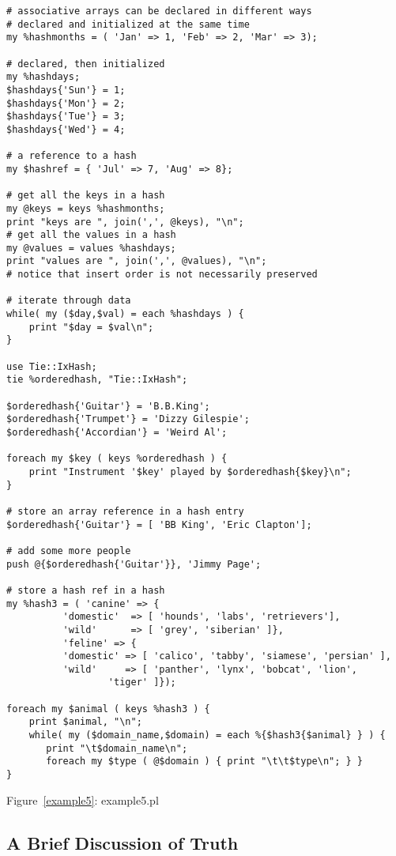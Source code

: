 \documentclass{article}
\begin{document}
\begin{verbatim}
# associative arrays can be declared in different ways
# declared and initialized at the same time
my %hashmonths = ( 'Jan' => 1, 'Feb' => 2, 'Mar' => 3);

# declared, then initialized
my %hashdays;
$hashdays{'Sun'} = 1;
$hashdays{'Mon'} = 2;
$hashdays{'Tue'} = 3;
$hashdays{'Wed'} = 4;

# a reference to a hash
my $hashref = { 'Jul' => 7, 'Aug' => 8};

# get all the keys in a hash
my @keys = keys %hashmonths;
print "keys are ", join(',', @keys), "\n";
# get all the values in a hash
my @values = values %hashdays;
print "values are ", join(',', @values), "\n";
# notice that insert order is not necessarily preserved

# iterate through data
while( my ($day,$val) = each %hashdays ) {
    print "$day = $val\n";
}

use Tie::IxHash;
tie %orderedhash, "Tie::IxHash";

$orderedhash{'Guitar'} = 'B.B.King';
$orderedhash{'Trumpet'} = 'Dizzy Gilespie';
$orderedhash{'Accordian'} = 'Weird Al';

foreach my $key ( keys %orderedhash ) {
    print "Instrument '$key' played by $orderedhash{$key}\n";
}

# store an array reference in a hash entry
$orderedhash{'Guitar'} = [ 'BB King', 'Eric Clapton'];

# add some more people
push @{$orderedhash{'Guitar'}}, 'Jimmy Page';

# store a hash ref in a hash
my %hash3 = ( 'canine' => { 
		  'domestic'  => [ 'hounds', 'labs', 'retrievers'],
		  'wild'      => [ 'grey', 'siberian' ]},
	      'feline' => { 
		  'domestic' => [ 'calico', 'tabby', 'siamese', 'persian' ],
		  'wild'     => [ 'panther', 'lynx', 'bobcat', 'lion', 
				  'tiger' ]});

foreach my $animal ( keys %hash3 ) {
    print $animal, "\n";	
    while( my ($domain_name,$domain) = each %{$hash3{$animal} } ) {
       print "\t$domain_name\n";
       foreach my $type ( @$domain ) { print "\t\t$type\n"; } }
}
\end{verbatim}
\label{example5}
\begin{center}{Figure~\ref{example5}: example5.pl}\end{center}

\subsection{A Brief Discussion of Truth}
\end{document}

